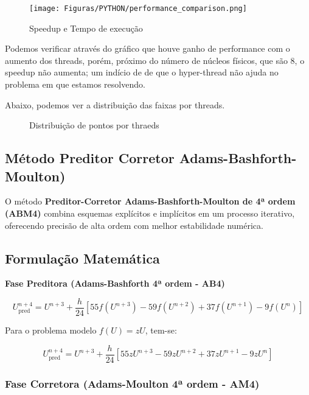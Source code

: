 \documentclass[a4paper,12pt]{article}
\begin{document}
\begin{figure}[H]
   \centering
   \texttt{[image: Figuras/PYTHON/performance\_comparison.png]}
   \caption{Speedup e Tempo de execução}
   \label{fig:speed_threads}
\end{figure}

Podemos verificar através do gráfico que houve ganho de performance com o aumento dos threads, porém, próximo do número de núcleos físicos, que são 8, o speedup não aumenta; um indício de de que o hyper-thread não ajuda no problema em que estamos resolvendo. 

Abaixo, podemos ver a distribuição das faixas por threads. 
\begin{figure}[H]
\centering
{} %
\quad %
\caption{Distribuição de pontos por thraeds}
\label{fig:euler_implicito}
\end{figure}

\subsection{Método Preditor Corretor \textbf{Adams-Bashforth-Moulton})}

O método \textbf{Preditor-Corretor Adams-Bashforth-Moulton de 4ª ordem (ABM4)} combina esquemas explícitos e implícitos em um processo iterativo, oferecendo precisão de alta ordem com melhor estabilidade numérica.

\subsection{Formulação Matemática}

\textbf{Fase Preditora (Adams-Bashforth 4ª ordem - AB4)}

\[
U^{n+4}_{\text{pred}} = U^{n+3} + \frac{h}{24}\left[55f(U^{n+3}) - 59f(U^{n+2}) + 37f(U^{n+1}) - 9f(U^n)\right]
\]

Para o problema modelo $f(U) = zU$, tem-se:

\[
U^{n+4}_{\text{pred}} = U^{n+3} + \frac{h}{24}\left[55zU^{n+3} - 59zU^{n+2} + 37zU^{n+1} - 9zU^n\right]
\]

\subsubsection{Fase Corretora (Adams-Moulton 4ª ordem - AM4)}
\end{document}
